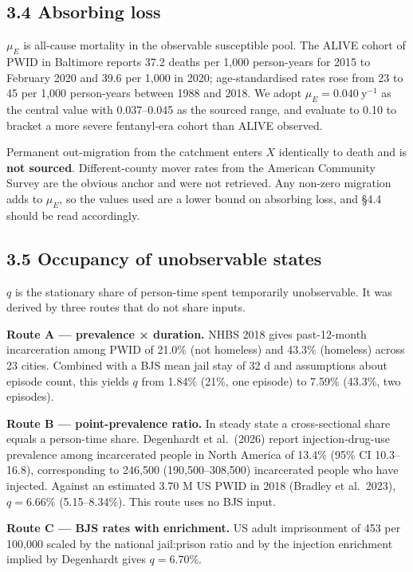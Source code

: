 \subsection{3.4 Absorbing loss}

\(\mu_E\) is all-cause mortality in the observable susceptible pool. The ALIVE cohort of PWID in Baltimore reports 37.2 deaths per 1,000 person-years for 2015 to February 2020 and 39.6 per 1,000 in 2020; age-standardised rates rose from 23 to 45 per 1,000 person-years between 1988 and 2018. We adopt \(\mu_E=0.040\ \mathrm{y}^{-1}\) as the central value with 0.037--0.045 as the sourced range, and evaluate to 0.10 to bracket a more severe fentanyl-era cohort than ALIVE observed.

Permanent out-migration from the catchment enters \(X\) identically to death and is \textbf{not sourced}. Different-county mover rates from the American Community Survey are the obvious anchor and were not retrieved. Any non-zero migration adds to \(\mu_E\), so the values used are a lower bound on absorbing loss, and §4.4 should be read accordingly.

\subsection{3.5 Occupancy of unobservable states}

\(q\) is the stationary share of person-time spent temporarily unobservable. It was derived by three routes that do not share inputs.

\textbf{Route A --- prevalence × duration.} NHBS 2018 gives past-12-month incarceration among PWID of 21.0\% (not homeless) and 43.3\% (homeless) across 23 cities. Combined with a BJS mean jail stay of 32 d and assumptions about episode count, this yields \(q\) from 1.84\% (21\%, one episode) to 7.59\% (43.3\%, two episodes).

\textbf{Route B --- point-prevalence ratio.} In steady state a cross-sectional share equals a person-time share. Degenhardt et al.~(2026) report injection-drug-use prevalence among incarcerated people in North America of 13.4\% (95\% CI 10.3--16.8), corresponding to 246,500 (190,500--308,500) incarcerated people who have injected. Against an estimated 3.70 M US PWID in 2018 (Bradley et al.~2023), \(q=6.66\%\) (5.15--8.34\%). This route uses no BJS input.

\textbf{Route C --- BJS rates with enrichment.} US adult imprisonment of 453 per 100,000 scaled by the national jail:prison ratio and by the injection enrichment implied by Degenhardt gives \(q=6.70\%\).

